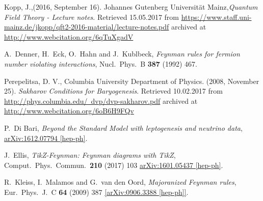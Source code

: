 \begin{thebibliography}{56}
Kopp, J.,(2016, September 16). Johannes Gutenberg Universität Mainz,\textit{Quantum Field Theory - Lecture notes}.  Retrieved
15.05.2017 from \href{https://www.staff.uni-mainz.de/jkopp/qft2-2016-material/lecture-notes.pdf}{https://www.staff.uni-mainz.de/jkopp/qft2-2016-material/lecture-notes.pdf} archived at
\href{http://www.webcitation.org/6qTuXgadV}{http://www.webcitation.org/6qTuXgadV}

A.~Denner, H.~Eck, O.~Hahn and J.~Kublbeck,
\textit{Feynman rules for fermion number violating interactions},
Nucl.\ Phys.\ B {\textbf{387}} (1992) 467.

Perepelitsa, D. V., Columbia University Department of Physics.
(2008, November 25). \textit{Sakharov Conditions for Baryogenesis}.  Retrieved
10.02.2017 from \href{http://phys.columbia.edu/~dvp/dvp-sakharov.pdf}{http://phys.columbia.edu/~dvp/dvp-sakharov.pdf} archived at
 \href{http://www.webcitation.org/6oB6H9FQv}{http://www.webcitation.org/6oB6H9FQv}

P.~Di Bari,
\textit{Beyond the Standard Model with leptogenesis and neutrino data},
\href{https://arxiv.org/abs/1612.07794}{arXiv:1612.07794 [hep-ph]}.

J.~Ellis,
\textit{TikZ-Feynman: Feynman diagrams with TikZ},
Comput.\ Phys.\ Commun.\  {\textbf {210}} (2017) 103
\href{https://arxiv.org/abs/1601.05437}{arXiv:1601.05437 [hep-ph]}.

R.~Kleiss, I.~Malamos and G.~van den Oord,
\textit{Majoranized Feynman rules},
Eur.\ Phys.\ J.\ C {\textbf{64}} (2009) 387
\href{https://arxiv.org/abs/0906.3388v2}{[arXiv:0906.3388 [hep-ph]]}.






\end{thebibliography}

